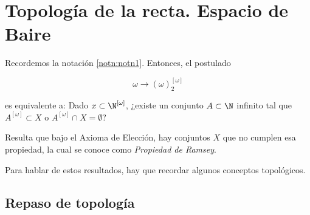 \section{Topología de la recta. Espacio de Baire}

Recordemos la notación \ref{notn:notn1}. Entonces, el postulado

\[
\omega \rightarrow (\omega)^{[\omega]}_2
\]

\noindent es equivalente a: Dado $x \subset \N^{[\omega]}$, ¿existe un conjunto $A \subset \N$ infinito tal que $A^{[\omega]} \subset X$ o $A^{[\omega]} \cap X = \emptyset$?

Resulta que bajo el Axioma de Elección, hay conjuntos $X$ que no cumplen esa propiedad, la cual se conoce como \textit{Propiedad de Ramsey}.

Para hablar de estos resultados, hay que recordar algunos conceptos topológicos.

\subsection{Repaso de topología}

